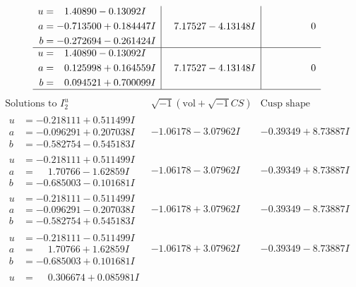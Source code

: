 \documentclass[1p]{elsarticle_modified}
\theoremstyle{definition}
\newcommand{\I}{\sqrt{-1}}
\begin{document}
$$\begin{array}{c|c|c}
\begin{aligned}
u &= \phantom{-}1.40890 - 0.13092 I \\
a &= -0.713500 + 0.184447 I \\
b &= -0.272694 - 0.261424 I\end{aligned}
 & \phantom{-}7.17527 - 4.13148 I & \phantom{-0.000000 } 0 \\ \hline\begin{aligned}
u &= \phantom{-}1.40890 - 0.13092 I \\
a &= \phantom{-}0.125998 + 0.164559 I \\
b &= \phantom{-}0.094521 + 0.700099 I\end{aligned}
 & \phantom{-}7.17527 - 4.13148 I & \phantom{-0.000000 } 0\\
 \hline 
 \end{array}$$\newpage$$\begin{array}{c|c|c}  
\text{Solutions to }I^u_{2}& \I (\text{vol} + \sqrt{-1}CS) & \text{Cusp shape}\\
 \hline 
\begin{aligned}
u &= -0.218111 + 0.511499 I \\
a &= -0.096291 + 0.207038 I \\
b &= -0.582754 - 0.545183 I\end{aligned}
 & -1.06178 - 3.07962 I & -0.39349 + 8.73887 I \\ \hline\begin{aligned}
u &= -0.218111 + 0.511499 I \\
a &= \phantom{-}1.70766 - 1.62859 I \\
b &= -0.685003 - 0.101681 I\end{aligned}
 & -1.06178 - 3.07962 I & -0.39349 + 8.73887 I \\ \hline\begin{aligned}
u &= -0.218111 - 0.511499 I \\
a &= -0.096291 - 0.207038 I \\
b &= -0.582754 + 0.545183 I\end{aligned}
 & -1.06178 + 3.07962 I & -0.39349 - 8.73887 I \\ \hline\begin{aligned}
u &= -0.218111 - 0.511499 I \\
a &= \phantom{-}1.70766 + 1.62859 I \\
b &= -0.685003 + 0.101681 I\end{aligned}
 & -1.06178 + 3.07962 I & -0.39349 - 8.73887 I \\ \hline\begin{aligned}
u &= \phantom{-}0.306674 + 0.085981 I \\

\end{aligned}
\end{array}$$
\end{document}
